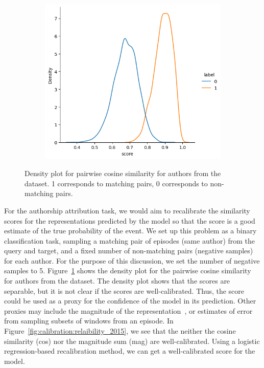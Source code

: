 \begin{figure}[h]
    \centering
    \begin{subfigure}{0.48\linewidth}
    \centering
    \includegraphics[width=\linewidth]{stylometryExtensions/figures/calibration_expts/cos_dist_2015.png}
    \end{subfigure} %
    \caption{Density plot for pairwise cosine similarity for authors from the \DSvarydelta{} dataset. 1 corresponds to matching pairs, 0 corresponds to non-matching pairs.}
    \label{fig:calibration:density}
\end{figure}
For the authorship attribution task, we would aim to recalibrate the similarity scores for the representations predicted by the model so that the score is a good estimate of the true probability of the event.
We set up this problem as a binary classification task, sampling a matching pair of episodes (same author) from the query and target, and a fixed number of non-matching pairs (negative samples) for each author.
For the purpose of this discussion, we set the number of negative samples to 5.
Figure~\ref{fig:calibration:density} shows the density plot for the pairwise cosine similarity for authors from the \DSvarydelta{} dataset.
The density plot shows that the scores are separable, but it is not clear if the scores are well-calibrated.
Thus, the score could be used as a proxy for the confidence of the model in its prediction.
Other proxies may include the magnitude of the representation~\citep{novoselov2023investigation}, or estimates of error from sampling subsets of windows from an episode.
In Figure~\ref{fig:calibration:relaibility_2015}, we see that the neither the cosine similarity (cos) nor the magnitude sum (mag) are well-calibrated.
Using a logistic regression-based recalibration method, we can get a well-calibrated score for the model.

